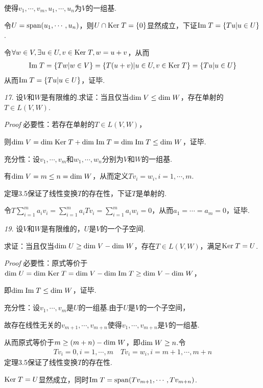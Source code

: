 使得\(v_1,\cdots,v_m,u_1,\cdots,u_n\)为\(V\)的一组基.

令\(U=\mathrm{span} (u_1,\cdots,u_n)\)，则\(U\cap \mathrm{Ker \;} T=\{0\}\)显然成立，下证\(\mathrm{Im \;} T=\{Tu|u\in U\}\).

令\(\forall w\in V,\exists u\in U,v\in \mathrm{Ker \;} T, w=u+v\)，从而
    \begin{align*}
        \mathrm{Im \;} T=\{Tw|w\in V\}=\{T(u+v)|u\in U,v\in \mathrm{Ker \;} T\}=\{Tu|u\in U\}
    \end{align*}
从而\(\mathrm{Im \;} T=\{Tu|u\in U\}\)，证毕.

\newpage

\textit{17.}
设\(V\)和\(W\)是有限维的.求证：当且仅当\(\mathrm{dim \;} V\leq \mathrm{dim \;} W\)，存在单射的\(T\in L(V,W)\).

\textit{Proof}
必要性：若存在单射的\(T\in L(V,W)\)，

则\(\mathrm{dim \;} V=\mathrm{dim \;} \mathrm{Ker \;} T+\mathrm{dim \;} \mathrm{Im \;} T=\mathrm{dim \;} \mathrm{Im \;} T \leq \mathrm{dim \;} W\)，证毕.

充分性：设\(v_1,\cdots,v_m\)和\(w_1,\cdots,w_n\)分别为\(V\)和\(W\)的一组基.

有\(\mathrm{dim \;} V=m\leq n=\mathrm{dim \;} W\)，从而定义\(Tv_i=w_i,i=1,\cdots,m\).

定理3.5保证了线性变换\(T\)的存在性，下证\(T\)是单射的.

令\(T\sum_{i=1}^m a_iv_i=\sum_{i=1}^m a_iTv_i=\sum_{i=1}^m a_iw_i=0\)，从而\(a_1=\cdots=a_m=0\)，证毕.

\hspace*{\fill}

\textit{19.}
设\(V\)和\(W\)是有限维的，\(U\)是\(V\)的一个子空间.

求证：当且仅当\(\mathrm{dim \;} U \geq \mathrm{dim \;} V-\mathrm{dim \;} W\)，存在\(T\in L(V,W)\)，满足\(\mathrm{Ker \;} T=U\).

\textit{Proof}
必要性：原式等价于\(\mathrm{dim \;} U=\mathrm{dim \;} \mathrm{Ker \;} T=\mathrm{dim \;} V-\mathrm{dim \;} \mathrm{Im \;} T \geq \mathrm{dim \;} V-\mathrm{dim \;} W\)，

即\(\mathrm{dim \;} \mathrm{Im \;} T \leq \mathrm{dim \;} W\)，证毕.

充分性：设\(v_1,\cdots,v_m\)是\(U\)的一组基.由于\(U\)是\(V\)的一个子空间，

故存在线性无关的\(v_{m+1},\cdots,v_{m+n}\)使得\(v_1,\cdots,v_{m+n}\)是\(V\)的一组基.

从而原式等价于\(m\geq (m+n)-\mathrm{dim \;} W\)，即\(\mathrm{dim \;} W\geq n\).令
    \begin{align*}
        Tv_i=0,i=1,\cdots,m \quad Tv_i=w_i,i=m+1,\cdots,m+n
    \end{align*}
定理3.5保证了线性变换\(T\)的存在性.

\(\mathrm{Ker \;} T=U\)显然成立，同时\(\mathrm{Im \;} T=\mathrm{span} (Tv_{m+1},\cdots,Tv_{m+n})\).

